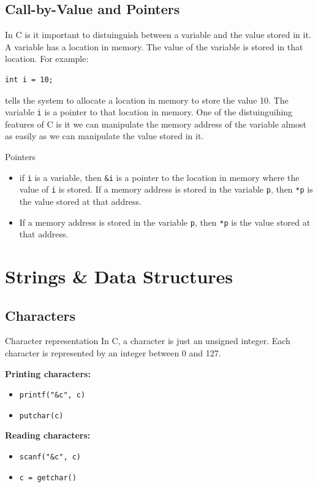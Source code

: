 \documentclass[a4paper, 10pt]{article}
\begin{document}
\subsection{Call-by-Value and Pointers}
In C is it important to distuinguish between a variable and the value stored in it. A variable has a location in memory. The value of the variable is stored in that location. For example:
\begin{lstlisting}[style=cStyle]
int i = 10;
\end{lstlisting}
tells the system to allocate a location in memory to store the value 10. The variable \texttt{i} is a pointer to that location in memory. One of the distuinguihing features of C is it we can manipulate the memory address of the variable almost as easily as we can manipulate the value stored in it.
\begin{conceptbox}{Pointers}{}
    \begin{itemize}
        \item if \texttt{i} is a variable, then \texttt{\&i} is a pointer to the location in memory where the value of \texttt{i} is stored.
              If a memory address is stored in the variable \texttt{p}, then \texttt{*p} is the value stored at that address.
        \item If a memory address is stored in the variable \texttt{p}, then \texttt{*p} is the value stored at that address.
    \end{itemize}
\end{conceptbox}
\section{Strings \& Data Structures}
\subsection{Characters}
\begin{conceptbox}{Character representation}{}
    In C, a character is just an unsigned integer. Each character is represented by an integer between 0 and 127.
\end{conceptbox}

\begin{minipage}{0.45\textwidth}
    \textbf{Printing characters:}

    \begin{itemize}
        \item \texttt{printf("\&c", c)}
        \item \texttt{putchar(c)}
    \end{itemize}
\end{minipage}
\begin{minipage}{0.45\textwidth}
    \textbf{Reading characters:}
    \begin{itemize}
        \item \texttt{scanf("\&c", c)}
        \item \texttt{c = getchar()}
    \end{itemize}
\end{minipage}
\end{document}
